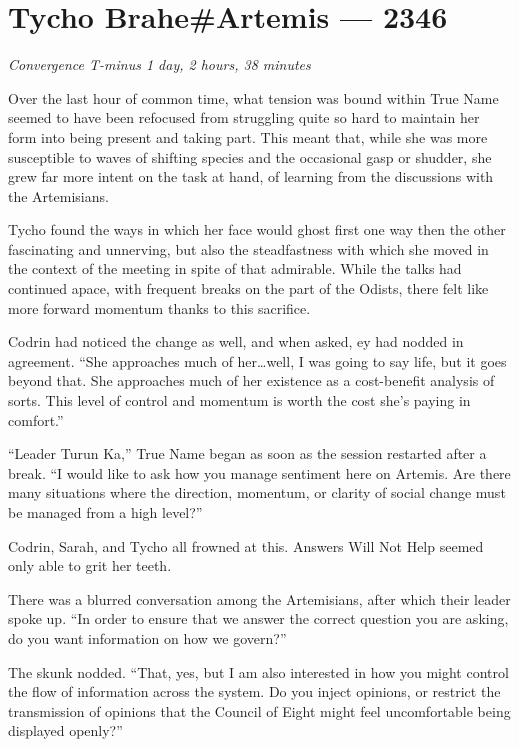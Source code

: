 \hypertarget{tycho-braheartemis-2346}{%
\chapter{Tycho Brahe\#Artemis — 2346}\label{tycho-braheartemis-2346}}

\begin{center}
\emph{Convergence T-minus 1 day, 2 hours, 38 minutes}
\end{center}

\noindent Over the last hour of common time, what tension was bound within True Name seemed to have been refocused from struggling quite so hard to maintain her form into being present and taking part. This meant that, while she was more susceptible to waves of shifting species and the occasional gasp or shudder, she grew far more intent on the task at hand, of learning from the discussions with the Artemisians.

Tycho found the ways in which her face would ghost first one way then the other fascinating and unnerving, but also the steadfastness with which she moved in the context of the meeting in spite of that admirable. While the talks had continued apace, with frequent breaks on the part of the Odists, there felt like more forward momentum thanks to this sacrifice.

Codrin had noticed the change as well, and when asked, ey had nodded in agreement. ``She approaches much of her\ldots well, I was going to say life, but it goes beyond that. She approaches much of her existence as a cost-benefit analysis of sorts. This level of control and momentum is worth the cost she's paying in comfort.''

``Leader Turun Ka,'' True Name began as soon as the session restarted after a break. ``I would like to ask how you manage sentiment here on Artemis. Are there many situations where the direction, momentum, or clarity of social change must be managed from a high level?''

Codrin, Sarah, and Tycho all frowned at this. Answers Will Not Help seemed only able to grit her teeth.

There was a blurred conversation among the Artemisians, after which their leader spoke up. ``In order to ensure that we answer the correct question you are asking, do you want information on how we govern?''

The skunk nodded. ``That, yes, but I am also interested in how you might control the flow of information across the system. Do you inject opinions, or restrict the transmission of opinions that the Council of Eight might feel uncomfortable being displayed openly?''

